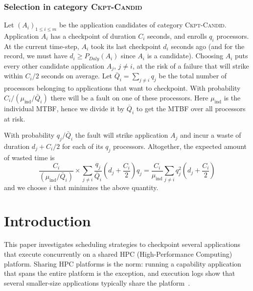 \documentclass{article}
\newcommand{\muind}{\mu_{\text{ind}}}
\newcommand{\period}[1]{P_{#1}}
\newcommand{\Ckptcat}{\textsc{Ckpt-Candid}\xspace}
\begin{document}
\subsubsection{Selection in category \Ckptcat}
\label{sec.ckptcat}

Let $(A_{i})_{1 \leq i \leq m}$ be the application candidates of category \Ckptcat. 
  Application $A_{i}$ has a checkpoint of duration $C_{i}$ seconds,
  and enrolls $q_{i}$ processors. At the current time-step, $A_{i}$ took its last checkpoint 
  $d_{i}$ seconds ago (and for the record, we must have $d_{i} \geq \period{Daly}(A_{i})$
  since $A_{i}$ is a candidate).
   Choosing $A_{i}$ puts every other candidate application $A_{j}$, $j \neq i$, 
   at the risk of a failure that will strike within $C_{i}/2$ seconds on average.
   Let $\bar{Q}_{i} = \sum_{j \neq i}q_{j}$ be the total number of
   processors belonging to applications that want to checkpoint.
   With probability $C_{i}/(\muind/\bar{Q}_{i})$ there will be a fault on one of these
   processors. Here $\muind$ is the individual MTBF, hence we divide it by $\bar{Q}_{i}$
   to get the MTBF over all processors at risk. 
   
   With probability $q_{j}/\bar{Q}_{i}$ the fault will strike application $A_{j}$ and incur a waste of duration $d_{j} + C_{i}/2$ for each of its $q_{j}$ processors. Altogether, the
   expected amount of wasted time is 
   $$\frac{C_{i}}{(\muind/\bar{Q}_{i}) } \times \sum_{j \neq i}\frac{q_{j}}{\bar{Q}_{i}}(d_{j}+ \frac{C_{i}}{2})q_{j} = \frac{C_{i}}{\muind} \sum_{j \neq i} q_{j}^{2}(d_{j}+ \frac{C_{i}}{2})$$
    and we choose $i$ that minimizes the above quantity.
    
    
   \section{Introduction}

This paper investigates scheduling strategies to checkpoint several applications
that execute concurrently on a shared HPC (High-Performance Computing) platform.
Sharing HPC platforms is the norm: running a capability application that spans the entire platform
is the exception, and execution logs show that several smaller-size applications typically share the platform~\cite{xx}.
\end{document}
